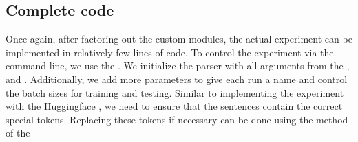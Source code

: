 \documentclass[letterpaper,10pt,english]{jupyterBook}
\begin{document}
\subsection{Complete code}
\label{\detokenize{PyTorchLightning:complete-code}}
\sphinxAtStartPar
Once again, after factoring out the custom modules, the actual experiment can be implemented in relatively few lines of code.
To control the experiment via the command line, we use the .
We initialize the parser with all arguments from the  , and .
Additionally, we add more parameters to give each run a name and control the batch sizes for training and testing.
Similar to implementing the experiment with the Huggingface , we need to ensure that the sentences contain the correct special tokens.
Replacing these tokens if necessary can be done using the \sphinxhyphen{}method of the 
\end{document}
